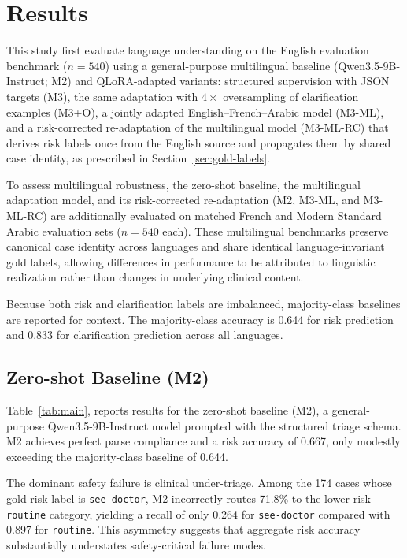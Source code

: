 
\section{Results}
\label{sec:results}
This study first evaluate language understanding on the English evaluation benchmark ($n=540$) using a general-purpose multilingual baseline (Qwen3.5-9B-Instruct; M2) and QLoRA-adapted variants: structured supervision with JSON targets (M3), the same adaptation with $4\times$ oversampling of clarification examples (M3+O), a jointly adapted English--French--Arabic model (M3-ML), and a risk-corrected re-adaptation of the multilingual model (M3-ML-RC) that derives risk labels once from the English source and propagates them by shared case identity, as prescribed in Section~\ref{sec:gold-labels}.

To assess multilingual robustness, the zero-shot baseline, the multilingual adaptation model, and its risk-corrected re-adaptation (M2, M3-ML, and M3-ML-RC) are additionally evaluated on matched French and Modern Standard Arabic evaluation sets ($n=540$ each). These multilingual benchmarks preserve canonical case identity across languages and share identical language-invariant gold labels, allowing differences in performance to be attributed to linguistic realization rather than changes in underlying clinical content.

Because both risk and clarification labels are imbalanced, majority-class baselines are reported for context. The majority-class accuracy is 0.644 for risk prediction and 0.833 for clarification prediction across all languages.

\subsection{Zero-shot Baseline (M2)}
Table~\ref{tab:main}, reports results for the zero-shot baseline (M2), a general-purpose Qwen3.5-9B-Instruct model prompted with the structured triage schema. M2 achieves perfect parse compliance and a risk accuracy of 0.667, only modestly exceeding the majority-class baseline of 0.644.

The dominant safety failure is clinical under-triage. Among the 174 cases whose gold risk label is \texttt{see-doctor}, M2 incorrectly routes 71.8\% to the lower-risk \texttt{routine} category, yielding a recall of only 0.264 for \texttt{see-doctor} compared with 0.897 for \texttt{routine}. This asymmetry suggests that aggregate risk accuracy substantially understates safety-critical failure modes.

